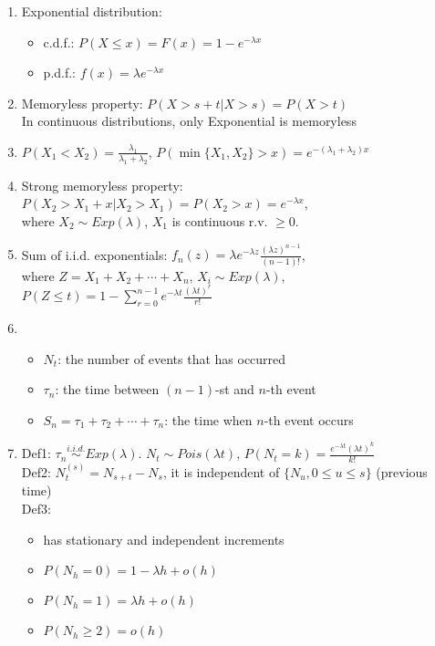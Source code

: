 \documentclass[11pt,a4paper]{article}
\begin{document}
\begin{enumerate}[resume]
\item Exponential distribution: \begin{itemize}
\item c.d.f.: $P(X \leq x) = F(x) = 1 - e^{-\lambda x}$
\item p.d.f.: $f(x) = \lambda e^{-\lambda x}$
\end{itemize}

\item Memoryless property: $P(X>s+t | X>s) = P(X>t)$ \\In continuous distributions, only Exponential is memoryless

\item $P(X_1 < X_2) = \frac{\lambda_1}{\lambda_1 + \lambda_2}$, $P(\min \{ X_1, X_2 \} > x) = e^{-(\lambda_1 + \lambda_2)x}$

\item Strong memoryless property: $P(X_2 > X_1 + x | X_2 > X_1) = P(X_2 > x) = e^{-\lambda x}$, \\where $X_2 \sim Exp(\lambda)$, $X_1$ is continuous r.v. $\geq 0$. 

\item Sum of i.i.d. exponentials: $f_n(z) = \lambda e^{-\lambda z} \frac{(\lambda z)^{n-1}}{(n-1)!}$, \\where $Z = X_1 + X_2 + \cdots + X_n$, $X_i \sim Exp(\lambda)$, \\$P(Z \leq t) = 1- \sum_{r=0}^{n-1} e^{-\lambda t} \frac{(\lambda t)^r}{r!}$

\item \begin{itemize}
\item $N_t$: the number of events that has occurred
\item $\tau_n$: the time between $(n-1)$-st and $n$-th event
\item $S_n = \tau_1 + \tau_2 + \cdots + \tau_n$: the time when $n$-th event occurs
\end{itemize}

\item Def1: $\tau_n \overset{i.i.d.}{\sim} Exp(\lambda)$. $N_t \sim Pois(\lambda t)$, $P(N_t=k) = \frac{e^{-\lambda t} (\lambda t)^k}{k!}$ \\
Def2: $N_t^{(s)} = N_{s+t} - N_s$, it is independent of $\{N_u, 0 \leq u \leq s \}$ (previous time) \\
Def3: \begin{itemize}
\item has stationary and independent increments
\item $P(N_h = 0) = 1 - \lambda h + o(h)$
\item $P(N_h = 1) = \lambda h + o(h)$
\item $P(N_h \geq 2) = o(h)$
\end{itemize}


\end{enumerate}
\end{document}
